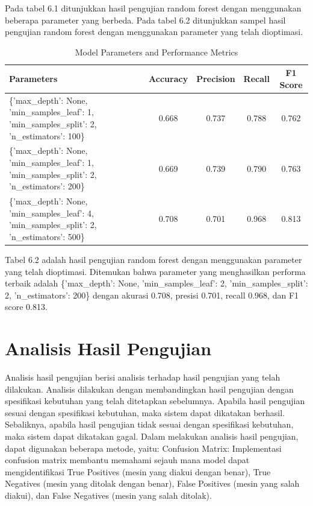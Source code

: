 Pada tabel 6.1 ditunjukkan hasil pengujian random forest dengan menggunakan beberapa parameter yang berbeda. Pada tabel 6.2 ditunjukkan sampel hasil pengujian random forest dengan menggunakan parameter yang telah dioptimasi.


\begin{table}[h]
    \centering
    \begin{tabularx}{\textwidth}{|X|c|c|c|c|}
    \hline
    \textbf{Parameters} & \textbf{Accuracy} & \textbf{Precision} & \textbf{Recall} & \textbf{F1 Score} \\
    \hline
    \{'max\_depth': None, 'min\_samples\_leaf': 1, 'min\_samples\_split': 2, 'n\_estimators': 100\} & 0.668 & 0.737 & 0.788 & 0.762 \\
    \hline
    \{'max\_depth': None, 'min\_samples\_leaf': 1, 'min\_samples\_split': 2, 'n\_estimators': 200\} & 0.669 & 0.739 & 0.790 & 0.763 \\
    \hline
    \{'max\_depth': None, 'min\_samples\_leaf': 4, 'min\_samples\_split': 2, 'n\_estimators': 500\} & 0.708 & 0.701 & 0.968 & 0.813 \\
    \hline
    \end{tabularx}
    \caption{Model Parameters and Performance Metrics}
    \label{table:sampel_hasil_pengujian_random_forest}
\end{table}

Tabel 6.2 adalah hasil pengujian random forest dengan menggunakan parameter yang telah dioptimasi. Ditemukan bahwa parameter yang menghasilkan performa terbaik adalah \{'max\_depth': None, 'min\_samples\_leaf': 2, 'min\_samples\_split': 2, 'n\_estimators': 200\} dengan akurasi 0.708, presisi 0.701, recall 0.968, dan F1 score 0.813.

\section{Analisis Hasil Pengujian}
Analisis hasil pengujian berisi analisis terhadap hasil pengujian yang telah dilakukan. Analisis dilakukan dengan membandingkan hasil pengujian dengan spesifikasi kebutuhan yang telah ditetapkan sebelumnya. Apabila hasil pengujian sesuai dengan spesifikasi kebutuhan, maka sistem dapat dikatakan berhasil. Sebaliknya, apabila hasil pengujian tidak sesuai dengan spesifikasi kebutuhan, maka sistem dapat dikatakan gagal.
Dalam melakukan analisis hasil pengujian, dapat digunakan beberapa metode, yaitu:
Confusion Matrix: Implementasi confusion matrix membantu memahami sejauh mana model dapat mengidentifikasi True Positives (mesin yang diakui dengan benar), True Negatives (mesin yang ditolak dengan benar), False Positives (mesin yang salah diakui), dan False Negatives (mesin yang salah ditolak).

